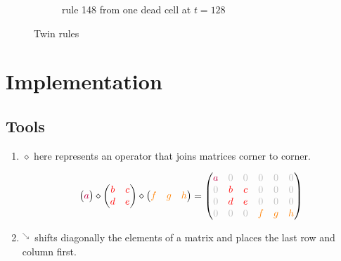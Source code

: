 \documentclass{article}
\begin{document}
\begin{figure}[H]
\begin{subfigure}[b]{0.48\textwidth}
         \caption{rule 148 from one dead cell at $t=128$}
         \label{fig:twin-2}
     \end{subfigure}
        \caption{Twin rules}
        \label{fig:twins}
\end{figure}


\pagebreak
\section{Implementation} \label{implementation}
\subsection{Tools}

\begin{enumerate}
\item 
$\diamond$ here represents an operator that joins matrices corner to corner.

\begin{equation}
\begin{pmatrix}
{\color{purple}a} 
\end{pmatrix}
\diamond
\begin{pmatrix}
{\color{red}b} & {\color{red}c} \\
{\color{red}d} & {\color{red}e}
\end{pmatrix}
\diamond
\begin{pmatrix}
{\color{orange}f} & {\color{orange}g} & {\color{orange}h} 
\end{pmatrix}
=
\begin{pmatrix}
 {\color{purple}a} & {\color{lightgray}0} & {\color{lightgray}0} & {\color{lightgray}0} & {\color{lightgray}0} & {\color{lightgray}0} \\
{\color{lightgray}0} & {\color{red}b} & {\color{red}c} & {\color{lightgray}0} & {\color{lightgray}0} & {\color{lightgray}0}\\
{\color{lightgray}0} & {\color{red}d} & {\color{red}e} & {\color{lightgray}0} & {\color{lightgray}0} & {\color{lightgray}0}\\
{\color{lightgray}0} & {\color{lightgray}0} & {\color{lightgray}0} & {\color{orange}f} & {\color{orange}g} & {\color{orange}h} 
\end{pmatrix}
\end{equation}

\item 
$^\searrow\,$ shifts diagonally the elements of a matrix and places the last row and column first.


\end{enumerate}
\end{document}

